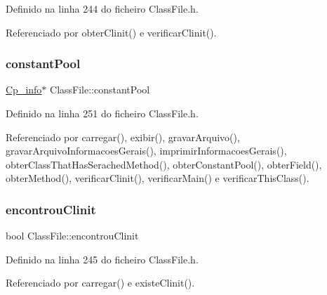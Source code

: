 Definido na linha 244 do ficheiro Class\+File.\+h.



Referenciado por obter\+Clinit() e verificar\+Clinit().

\mbox{\label{classClassFile_a5883215e48e253a84c105a18d34049ca}} 
\subsubsection{\texorpdfstring{constant\+Pool}{constantPool}}
{\footnotesize\ttfamily \hyperlink{structCp__info}{Cp\+\_\+info}$\ast$ Class\+File\+::constant\+Pool\hspace{0.3cm}{\ttfamily [private]}}



Definido na linha 251 do ficheiro Class\+File.\+h.



Referenciado por carregar(), exibir(), gravar\+Arquivo(), gravar\+Arquivo\+Informacoes\+Gerais(), imprimir\+Informacoes\+Gerais(), obter\+Class\+That\+Has\+Serached\+Method(), obter\+Constant\+Pool(), obter\+Field(), obter\+Method(), verificar\+Clinit(), verificar\+Main() e verificar\+This\+Class().

\mbox{\label{classClassFile_a5c60c8d51584f48f22bdbdd719960e05}} 
\subsubsection{\texorpdfstring{encontrou\+Clinit}{encontrouClinit}}
{\footnotesize\ttfamily bool Class\+File\+::encontrou\+Clinit\hspace{0.3cm}{\ttfamily [private]}}



Definido na linha 245 do ficheiro Class\+File.\+h.



Referenciado por carregar() e existe\+Clinit().

\mbox{\label{classClassFile_ad8d08e096c470901c62d1a9e31a202bf}} 
